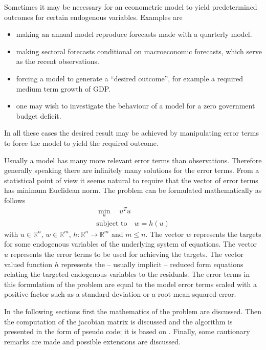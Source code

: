\documentclass[english,memorandum,old,sectionpage]{cpbart}
\newcommand{\Rbb}{\mathbb{R}}
\begin{document}
Sometimes it may be necessary for an econometric model
to yield predetermined outcomes for certain endogenous variables.
Examples are

\begin{itemize}
\item making an annual model reproduce forecasts made with a quarterly model.
\item making sectoral forecasts conditional on macroeconomic forecasts,
which serve as the recent observations.
\item forcing a model to generate a ``desired outcome'', for example
a required medium term growth of GDP.
\item one may wish to investigate the behaviour of a model for
a zero government budget deficit.
\end{itemize}
%
In all these cases the desired result may be achieved
by manipulating  error terms to force the model to yield
the required outcome.

Usually a model has many more relevant error terms than
observations.
Therefore generally speaking there are infinitely many solutions
for the error terms.
From a statistical point of view it seems natural to require that the
vector of error terms has minimum Euclidean norm.
The  problem can be formulated mathematically as follows
\begin{gather*}
\min _u \quad u^T u    \\
\mbox{subject to} \quad w = h(u)
\end{gather*}
with $u \in \Rbb^n$, $w \in \Rbb^m$, $h:\Rbb^n \rightarrow \Rbb^m$
and $m \le n$.
The vector $w$ represents the
targets for some endogenous variables of the underlying system of equations.
The vector $u$ represents the error terms to be used for achieving the targets.
The vector valued function $h$ represents the -- usually implicit --
reduced form equations relating the targeted endogenous variables to the residuals.
The error terms in this formulation of the problem
are equal to the model error terms scaled with a positive factor
such as a standard deviation or a root-mean-squared-error.

In the following sections first the mathematics of the problem are discussed.
Then the computation of the jacobian matrix is discussed and
the algorithm is presented in the form of pseudo code;
it is based on \cite{sanfit}.
Finally, some cautionary remarks are made and
possible extensions are discussed.
\end{document}
